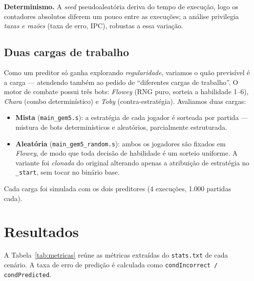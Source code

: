 \documentclass[12pt]{article}
\begin{document}
\noindent\textbf{Determinismo.} A \emph{seed} pseudoaleatória deriva do
tempo de execução, logo os contadores absolutos diferem um pouco entre as
execuções; a análise privilegia \emph{taxas e razões} (taxa de erro, IPC),
robustas a essa variação.

\subsection{Duas cargas de trabalho}
\label{sec:cargas}

Como um preditor só ganha explorando \emph{regularidade}, variamos o quão
previsível é a carga --- atendendo também ao pedido de ``diferentes cargas
de trabalho''. O motor de combate possui três bots: \emph{Flowey} (RNG
puro, sorteia a habilidade 1--6), \emph{Chara} (combo determinístico) e
\emph{Toby} (contra-estratégia). Avaliamos duas cargas:

\begin{itemize}[nosep]
  \item \textbf{Mista} (\texttt{main\_gem5.s}): a estratégia de cada
    jogador é sorteada por partida --- mistura de bots determinísticos e
    aleatórios, parcialmente estruturada.
  \item \textbf{Aleatória} (\texttt{main\_gem5\_random.s}): ambos os
    jogadores são fixados em \emph{Flowey}, de modo que toda decisão de
    habilidade é um sorteio uniforme. A variante foi \emph{clonada} do
    original alterando apenas a atribuição de estratégia no \texttt{\_start},
    sem tocar no binário base.
\end{itemize}

\noindent Cada carga foi simulada com os dois preditores (4 execuções,
1.000 partidas cada).

\section{Resultados}

A Tabela~\ref{tab:metricas} reúne as métricas extraídas do
\texttt{stats.txt} de cada cenário. A taxa de erro de predição é
calculada como \texttt{condIncorrect / condPredicted}.
\end{document}
